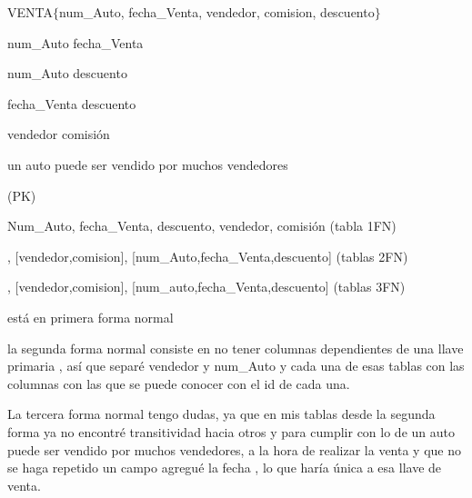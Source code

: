 \documentclass{article}
\begin{document}
\noindent VENTA$\mathrm{\{}$num\_Auto, fecha\_Venta, vendedor, comision, descuento$\mathrm{\}}$

\noindent num\_Auto fecha\_Venta

\noindent num\_Auto descuento

\noindent fecha\_Venta descuento

\noindent vendedor  comisi\'{o}n

\noindent un auto puede ser vendido por muchos vendedores

(PK)

\noindent Num\_Auto, fecha\_Venta, descuento, vendedor, comisi\'{o}n (tabla 1FN)

, [vendedor,comision], [num\_Auto,fecha\_Venta,descuento] (tablas 2FN)

, [vendedor,comision], [num\_auto,fecha\_Venta,descuento] (tablas 3FN)

\noindent 

\noindent est\'{a} en primera forma normal 

\noindent la segunda forma normal consiste en no tener columnas dependientes de una llave primaria , as\'{i} que separ\'{e} vendedor y num\_Auto y cada una de esas tablas con las columnas con las que se puede conocer con el id de cada una.

\noindent 

\noindent La tercera forma normal tengo dudas, ya que en mis tablas desde la segunda forma ya no encontr\'{e} transitividad hacia otros y para cumplir con lo de un auto puede ser vendido por muchos vendedores, a la hora de realizar la venta y que no se haga repetido un campo agregu\'{e} la fecha , lo que har\'{i}a \'{u}nica a esa llave de venta.
\end{document}
